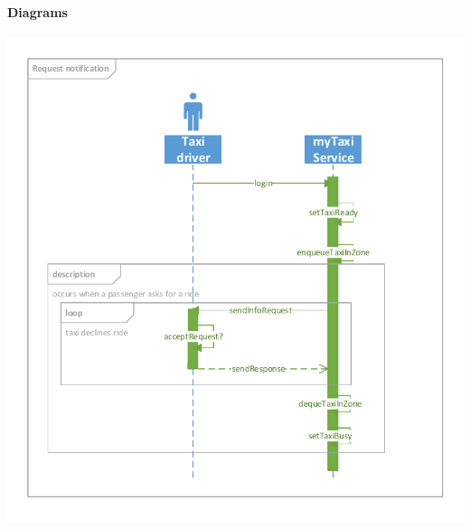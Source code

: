	\paragraph{Diagrams}
	\begin{center}
	\includegraphics[width=\textwidth]{diagrams/notification}
\end{center}
	
